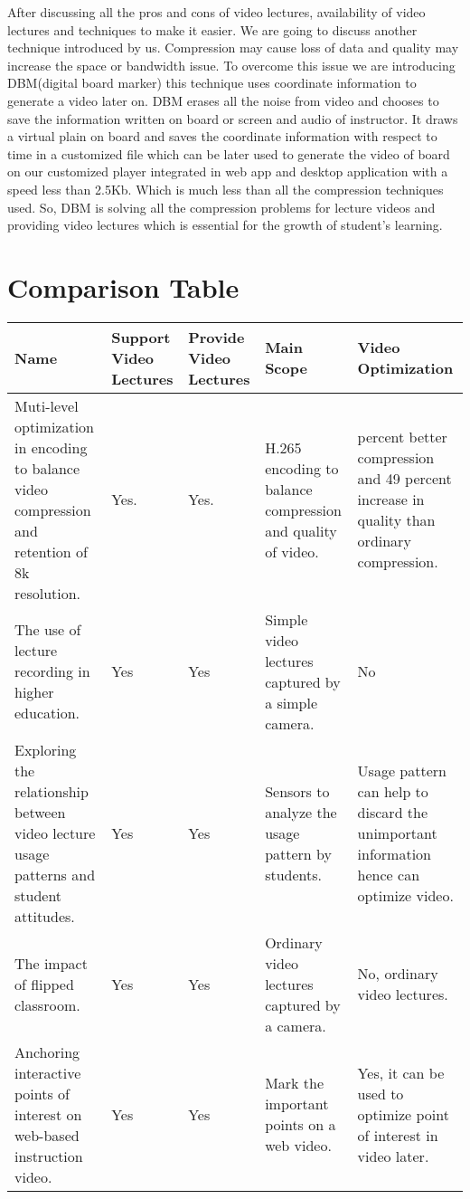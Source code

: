 After discussing all the pros and cons of video lectures, availability of video lectures and techniques to make it easier. We are going to discuss another technique introduced by us. Compression may cause loss of data and quality may increase the space or bandwidth issue. To overcome this issue we are introducing DBM(digital board marker) this technique uses coordinate information to generate a video later on. DBM erases all the noise from video and chooses to save the information written on board or screen and audio of instructor. It draws a virtual plain on board and saves the coordinate information with respect to time in a customized file which can be later used to generate the video of board on our customized player integrated in web app and desktop application with a speed less than 2.5Kb. Which is much less than all the compression techniques used. So, DBM is solving all the compression problems for lecture videos and providing video lectures which is essential for the growth of student's learning.
 

 
\section{Comparison Table}

\begin{sideways}
\centering
\begin{tabularx}{1.5\textwidth} { 
  | >{\raggedright\arraybackslash}X 
  | >{\centering\arraybackslash}X | >{\centering\arraybackslash}X | >{\centering\arraybackslash}X | >{\raggedleft\arraybackslash}X | }
 \hline
\bfseries{Name} & \bfseries{Support Video Lectures} &\bfseries{Provide Video Lectures} &\bfseries{Main Scope} & \bfseries{Video Optimization}  \\
\hline
Muti-level optimization in encoding to balance video compression and retention of 8k resolution.\cite{Murthy2016}
& Yes.
& Yes.
& H.265 encoding to balance compression and quality of video.
& 59 percent better compression and 49 percent increase in quality than ordinary compression.
\\
\hline
The use of lecture recording in higher education.\cite{OCallaghan2017}
& Yes
& Yes
& Simple video lectures captured by a simple camera.
& No
\\
\hline
Exploring the relationship between video lecture usage patterns and student attitudes.\cite{Giannakos2016}
& Yes
& Yes
& Sensors to analyze the usage pattern by students.
& Usage pattern can help to discard the unimportant information hence can optimize video.
\\
\hline
The impact of flipped classroom.\cite{Lo2019}
& Yes
& Yes
& Ordinary video lectures captured by a camera.
& No, ordinary video lectures.
\\
\hline
Anchoring interactive points of interest on web-based instruction video.\cite{Pimentel2019}
& Yes
& Yes
& Mark the important points on a web video.
& Yes, it can be used to optimize point of interest in video later.
\\
\hline
\end{tabularx}
\end{sideways}


